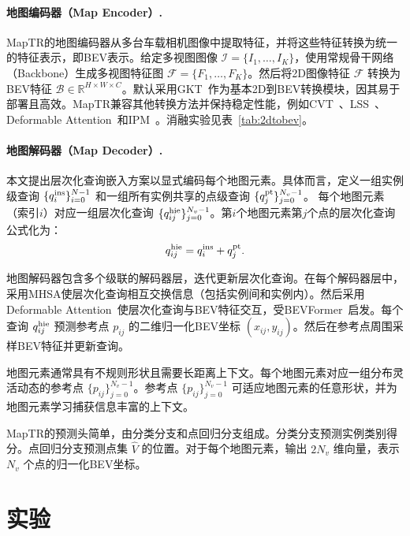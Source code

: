 \documentclass{article} %
\begin{document}
\paragraph{地图编码器（Map Encoder）.}
MapTR的地图编码器从多台车载相机图像中提取特征，并将这些特征转换为统一的特征表示，即BEV表示。给定多视图图像 $\mathcal{I}=\{I_1, \ldots, I_K\}$，使用常规骨干网络（Backbone）生成多视图特征图 $\mathcal{F}=\{F_1, \ldots, F_K\}$。然后将2D图像特征 $\mathcal{F}$ 转换为BEV特征 $\mathcal{B} \in \mathbb{R}^{H\times W \times C}$。默认采用GKT~\citep{gkt}作为基本2D到BEV转换模块，因其易于部署且高效。MapTR兼容其他转换方法并保持稳定性能，例如CVT~\citep{cvt}、LSS~\citep{lss,liu2022bevfusion,bevdepth,bevdet}、Deformable Attention~\citep{bevformer,deformdetr}和IPM~\citep{ipm}。消融实验见表~\ref{tab:2dtobev}。

\paragraph{地图解码器（Map Decoder）.}
本文提出层次化查询嵌入方案以显式编码每个地图元素。具体而言，定义一组实例级查询 $\{ q^{\rm{ins}}_i\}_{i=0}^{N-1}$ 和一组所有实例共享的点级查询 $\{q^{\rm{pt}}_j\}_{j=0}^{N_v-1}$。 
每个地图元素（索引$i$）对应一组层次化查询 $\{q^{\rm{hie}}_{ij}\}_{j=0}^{N_v-1}$。第$i$个地图元素第$j$个点的层次化查询公式化为：
\begin{equation}
\begin{gathered}
    q^{\rm{hie}}_{ij} =  q^{\rm{ins}}_i + q^{\rm{pt}}_j.
\end{gathered}
\end{equation}


地图解码器包含多个级联的解码器层，迭代更新层次化查询。在每个解码器层中，采用MHSA使层次化查询相互交换信息（包括实例间和实例内）。然后采用Deformable Attention~\citep{deformdetr}使层次化查询与BEV特征交互，受BEVFormer~\citep{bevformer}启发。每个查询 $q^{\rm{hie}}_{ij}$ 预测参考点 $p_{ij}$ 的二维归一化BEV坐标 $(x_{ij},y_{ij})$。然后在参考点周围采样BEV特征并更新查询。

地图元素通常具有不规则形状且需要长距离上下文。每个地图元素对应一组分布灵活动态的参考点 $\{p_{ij}\}_{j=0}^{N_v-1}$。参考点 $\{p_{ij}\}_{j=0}^{N_v-1}$ 可适应地图元素的任意形状，并为地图元素学习捕获信息丰富的上下文。

MapTR的预测头简单，由分类分支和点回归分支组成。分类分支预测实例类别得分。点回归分支预测点集 $\hat{V}$ 的位置。对于每个地图元素，输出 $2N_v$ 维向量，表示 $N_v$ 个点的归一化BEV坐标。




\section{实验}
\end{document}
